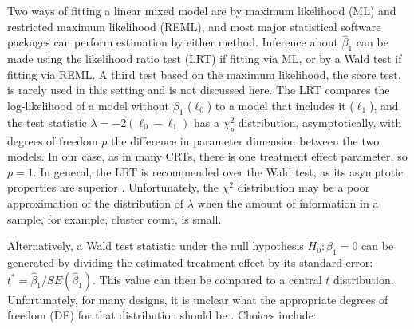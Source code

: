 \documentclass[twocolumn]{bmcart}%
\begin{document}
Two ways of fitting a linear mixed model are by maximum likelihood (ML) and restricted maximum likelihood (REML), and most major statistical software packages can perform estimation by either method. Inference about $\hat{\beta}_1$ can be made using the likelihood ratio test (LRT) if fitting via ML, or by a Wald test if fitting via REML. A third test based on the maximum likelihood, the score test, is rarely used in this setting and is not discussed here. The LRT compares the log-likelihood of a model without $\beta_1$ ($\ell_0$) to a model that includes it ($\ell_1$), and the test statistic $\lambda = -2(\ell_0 - \ell_1)$ has a $\chi^2_p$ distribution, asymptotically, with degrees of freedom $p$ the difference in parameter dimension between the two models. In our case, as in many CRTs, there is one treatment effect parameter, so $p=1$. In general, the LRT is recommended over the Wald test, as its asymptotic properties are superior \cite{cox_theoretical_1979}.  Unfortunately, the $\chi^2$ distribution may be a poor approximation of the distribution of $\lambda$ when the amount of information in a sample, for example, cluster count, is small.


Alternatively, a Wald test statistic under the null hypothesis $H_0: \beta_1=0$ can be generated by dividing the estimated treatment effect by its standard error: $t^* =\hat{\beta}_1 / SE(\hat{\beta}_1)$.  This value can then be compared to a central $t$ distribution. Unfortunately, for many designs, it is unclear what the appropriate degrees of freedom (DF) for that distribution should be \cite{bates_fitting_2015}. Choices include:
\end{document}
